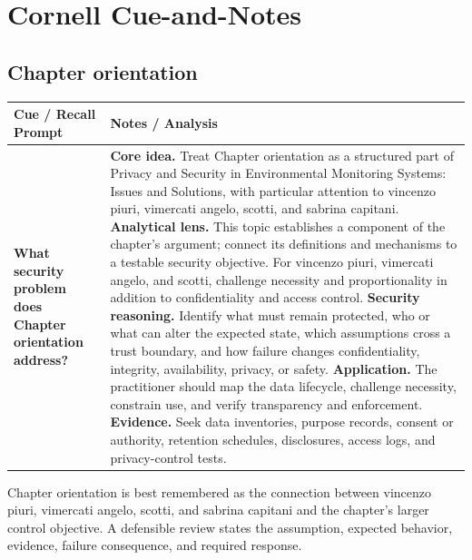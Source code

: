 \documentclass[11pt]{article}
\newcommand{\CornellHeader}{%
\rowcolor{Navy}\color{white}\bfseries Cue / Recall Prompt & \color{white}\bfseries Notes / Analysis\\\hline}
\newcommand{\CornellRow}[2]{%
\cellcolor{CueGray}\RaggedRight\textbf{#1} & \RaggedRight #2\\\hline}
\begin{document}
\section*{Cornell Cue-and-Notes}
\subsection*{Chapter orientation}
\begin{longtable}{>{\RaggedRight\arraybackslash}p{}|>{\RaggedRight\arraybackslash}p{}}
\CornellHeader
\CornellRow{What security problem does Chapter orientation address?}{\textbf{Core idea.} Treat Chapter orientation as a structured part of Privacy and Security in Environmental Monitoring Systems: Issues and Solutions, with particular attention to vincenzo piuri, vimercati angelo, scotti, and sabrina capitani. \textbf{Analytical lens.} This topic establishes a component of the chapter's argument; connect its definitions and mechanisms to a testable security objective. For vincenzo piuri, vimercati angelo, and scotti, challenge necessity and proportionality in addition to confidentiality and access control. \textbf{Security reasoning.} Identify what must remain protected, who or what can alter the expected state, which assumptions cross a trust boundary, and how failure changes confidentiality, integrity, availability, privacy, or safety. \textbf{Application.} The practitioner should map the data lifecycle, challenge necessity, constrain use, and verify transparency and enforcement. \textbf{Evidence.} Seek data inventories, purpose records, consent or authority, retention schedules, disclosures, access logs, and privacy-control tests.}
\end{longtable}
\begin{topicsummary}
Chapter orientation is best remembered as the connection between vincenzo piuri, vimercati angelo, scotti, and sabrina capitani and the chapter's larger control objective. A defensible review states the assumption, expected behavior, evidence, failure consequence, and required response.
\end{topicsummary}
\end{document}
